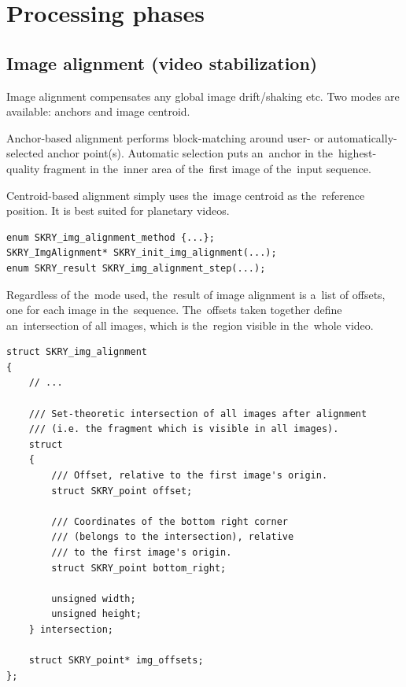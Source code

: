 \documentclass[12pt]{article}
\newcommand{\nbd}{\nobreakdash}
\begin{document}
\section{Processing phases}

\subsection{Image alignment (video stabilization)}\label{sec:imgalignment}

Image alignment compensates any global image drift/shaking etc. Two modes are available: anchors and image centroid.

Anchor-based alignment performs block\nbd-matching around user- or automatically\nbd-selec\-ted anchor point(s).
Automatic selection puts an~anchor in the~highest\nbd-quality fragment in the~inner area of the~first image of the~input
sequence.

Centroid\nbd-based alignment simply uses the~image centroid as the~reference position. It is best suited for planetary
videos.

\begin{lstlisting}[caption={Image alignment ({\ttfamily{img\_align.h/.c}})}]
enum SKRY_img_alignment_method {...};
SKRY_ImgAlignment* SKRY_init_img_alignment(...);
enum SKRY_result SKRY_img_alignment_step(...);
\end{lstlisting}

Regardless of the~mode used, the~result of image alignment is a~list of offsets, one for each image in the~sequence.
The~offsets taken together define an~intersection of all images, which is the~region visible in the~whole video.

\begin{lstlisting}
struct SKRY_img_alignment
{
    // ...

    /// Set-theoretic intersection of all images after alignment
    /// (i.e. the fragment which is visible in all images).
    struct
    {
        /// Offset, relative to the first image's origin.
        struct SKRY_point offset;

        /// Coordinates of the bottom right corner
        /// (belongs to the intersection), relative
        /// to the first image's origin.
        struct SKRY_point bottom_right;

        unsigned width;
        unsigned height;
    } intersection;

    struct SKRY_point* img_offsets;
};
\end{lstlisting}
\end{document}
